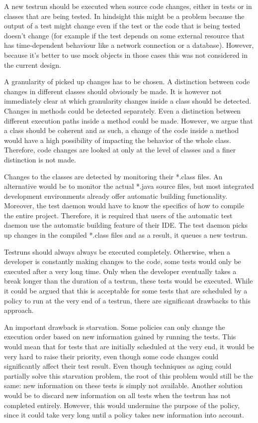 \documentclass[i2]{oss}
\begin{document}
A new testrun should be executed when source code changes, either in tests or in classes that are being tested. 
In hindsight this might be a problem because the output of a test might
change even if the test or the code that is being tested doesn't change
(for example if the test depends on some external resource that has 
time-dependent behaviour like a network connection or a database).
However, because it's better to use mock objects in those cases this was
not considered in the current design.

A granularity of picked up changes has to be chosen.
A distinction between code changes in different classes should obviously be made.
It is however not immediately clear at which granularity changes inside a class should be detected.
Changes in methods could be detected separately.
Even a distinction between different execution paths inside a method could be made.
However, we argue that a class should be coherent and as such, a change of the code inside a method would have a high possibility of impacting the behavior of the whole class.
Therefore, code changes are looked at only at the level of classes and a finer distinction is not made.

Changes to the classes are detected by monitoring their *.class files.
An alternative would be to monitor the actual *.java source files, but most integrated development environments already offer automatic building functionality.
Moreover, the test daemon would have to know the specifics of how to compile the entire project. 
Therefore, it is required that users of the automatic test daemon use the automatic building feature of their IDE.
The test daemon picks up changes in the compiled *.class files and as a result, it queues a new testrun.

Testruns should always always be executed completely.
Otherwise, when a developer is constantly making changes to the code, some tests would only be executed after a very long time.
Only when the developer eventually takes a break longer than the duration of a testrun, these tests would be executed.
While it could be argued that this is acceptable for some tests that are scheduled by a policy to run at the very end of a testrun, there are significant drawbacks to this approach.

An important drawback is starvation. Some policies can only change the execution order based on new information gained by running the tests.
This would mean that for tests that are initially scheduled at the very end, it would be very hard to raise their priority, even though some code changes could significantly affect their test result.
Even though techniques as aging could partially solve this starvation problem, the root of this problem would still be the same: new information on these tests is simply not available. Another solution would be to discard new information on all tests when the testrun has not completed entirely. However, this would undermine the purpose of the policy, since it could take very long until a policy takes new information into account.
\end{document}
